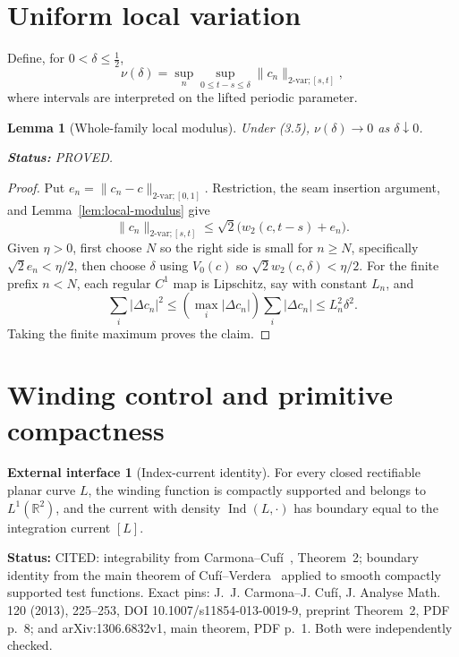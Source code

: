 \documentclass[11pt]{article}
\newtheorem{lemma}[theorem]{Lemma}
\theoremstyle{definition}
\newtheorem{hypothesis}[theorem]{External interface}
\theoremstyle{remark}
\newcommand{\R}{\mathbb R}
\newcommand{\Ind}{\operatorname{Ind}}
\newcommand{\status}[1]{\par\smallskip\noindent\textbf{Status:}
  \begingroup\small\sffamily #1.\endgroup\par\smallskip}
\begin{document}
\section{Uniform local variation}

Define, for $0<\delta\leq\tfrac12$,
\[
 \nu(\delta)=
 \sup_n\sup_{0\leq t-s\leq\delta}
       \|c_n\|_{2\text{-var};[s,t]},                    \tag{4.1}
\]
where intervals are interpreted on the lifted periodic parameter.

\begin{lemma}[Whole-family local modulus]\label{lem:nu}
Under (3.5), $\nu(\delta)\to0$ as $\delta\downarrow0$.
\status{PROVED}
\end{lemma}

\begin{proof}
Put $e_n=\|c_n-c\|_{2\text{-var};[0,1]}$.  Restriction, the seam insertion
argument, and Lemma~\ref{lem:local-modulus} give
\[
 \|c_n\|_{2\text{-var};[s,t]}
 \leq\sqrt2\bigl(w_2(c,t-s)+e_n\bigr).                  \tag{4.2}
\]
Given $\eta>0$, first choose $N$ so the right side is small for $n\geq N$,
specifically $\sqrt2e_n<\eta/2$, then choose $\delta$ using $V_0(c)$ so
$\sqrt2w_2(c,\delta)<\eta/2$.  For the finite prefix $n<N$, each
regular $C^1$ map is Lipschitz, say with constant $L_n$, and
\[
 \sum_i|\Delta c_n|^2
 \leq(\max_i|\Delta c_n|)\sum_i|\Delta c_n|
 \leq L_n^2\delta^2.
\]
Taking the finite maximum proves the claim.
\end{proof}

\section{Winding control and primitive compactness}

\begin{hypothesis}[Index-current identity]\label{hyp:index-current}
For every closed rectifiable planar curve $L$, the winding function is
compactly supported and belongs to $L^1(\R^2)$, and the current with density
$\Ind(L,\cdot)$ has boundary equal to the integration current $[L]$.
\status{CITED: integrability from Carmona--Cuf\'i~\cite{CC}, Theorem~2; boundary
identity from the main theorem of Cuf\'i--Verdera~\cite{CV} applied to smooth compactly
supported test functions.  Exact pins: J.~J. Carmona--J. Cuf\'i,
J. Analyse Math. 120 (2013), 225--253, DOI
10.1007/s11854-013-0019-9, preprint Theorem~2, PDF p.~8; and
arXiv:1306.6832v1, main theorem, PDF p.~1.  Both were independently checked}
\end{hypothesis}
\end{document}
